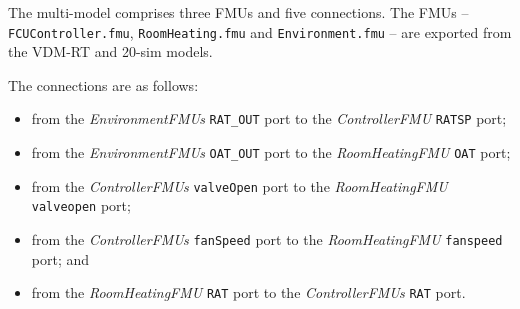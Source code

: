 %
The multi-model comprises three FMUs and five connections. The FMUs -- \texttt{FCUController.fmu}, \texttt{RoomHeating.fmu} and \texttt{Environment.fmu} -- are exported from the VDM-RT and 20-sim models.  

The connections are as follows: 
\begin{itemize}
\item from the \emph{EnvironmentFMUs} \texttt{RAT\_OUT} port to the \emph{ControllerFMU} \texttt{RATSP} port;
\item from the \emph{EnvironmentFMUs} \texttt{OAT\_OUT} port to the \emph{RoomHeatingFMU} \texttt{OAT} port;
\item from the \emph{ControllerFMUs} \texttt{valveOpen} port to the \emph{RoomHeatingFMU} \texttt{valveopen} port;
\item from the \emph{ControllerFMUs} \texttt{fanSpeed} port to the \emph{RoomHeatingFMU} \texttt{fanspeed} port; and
\item from the \emph{RoomHeatingFMU} \texttt{RAT} port to the \emph{ControllerFMUs} \texttt{RAT} port.
\end{itemize}

%
%
%

